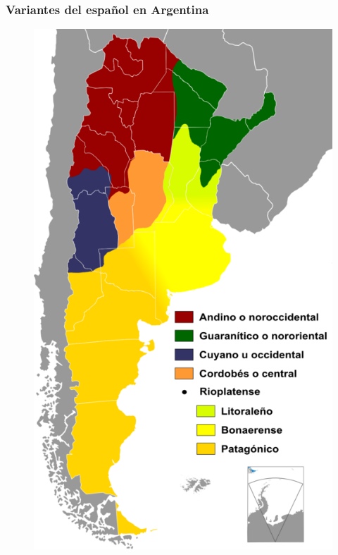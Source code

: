 \documentclass[mathserif]{beamer}%
\begin{document}
\begin{frame}
	\frametitle{Variantes del español en Argentina}
	\begin{figure}
		\includegraphics[scale=0.3]{../template_tesis/Images/Dialectos_del_idioma_espanol_en_Argentina.png}\\
	\end{figure}
\end{frame}
\end{document}

